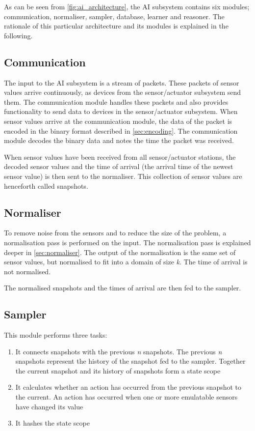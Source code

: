 As can be seen from \cref{fig:ai_architecture}, the AI subsystem contains six modules; communication, normaliser, sampler, database, learner and reasoner. The rationale of this particular architecture and its modules is explained in the following.

\subsection{Communication}
The input to the AI subsystem is a stream of packets. These packets of sensor values arrive continuously, as devices from the sensor/actuator subsystem send them. The communication module handles these packets and also provides functionality to send data to devices in the sensor/actuator subsystem. When sensor values arrive at the communication module, the data of the packet is encoded in the binary format described in \cref{sec:encoding}. The communication module decodes the binary data and notes the time the packet was received.

When sensor values have been received from all sensor/actuator stations, the decoded sensor values and the time of arrival (the arrival time of the newest sensor value) is then sent to the normaliser. This collection of sensor values are henceforth called snapshots.

\subsection{Normaliser}
To remove noise from the sensors and to reduce the size of the problem, a normalisation pass is performed on the input. The normalisation pass is explained deeper in \cref{sec:normaliser}. The output of the normalisation is the same set of sensor values, but normalised to fit into a domain of size \emph{k}. The time of arrival is not normalised.

The normalised snapshots and the times of arrival are then fed to the sampler.

\subsection{Sampler}
This module performs three tasks:

\begin{enumerate}
\item It connects snapshots with the previous \emph{n} snapshots. The previous \emph{n} snapshots represent the history of the snapshot fed to the sampler. Together the current snapshot and its history of snapshots form a state scope
\item It calculates whether an action has occurred from the previous snapshot to the current. An action has occurred when one or more emulatable sensors have changed its value
\item It hashes the state scope
\end{enumerate}

